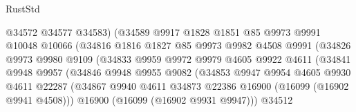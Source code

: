\begin{lexlean}{RustStd}
\begin{coremodule}
                                  @34572
                                  @34577
                                  @34583)
                                (@34589
                                  @9917
                                  @1828
                                  @1851
                                  @85
                                  @9973
                                  @9991
                                  @10048
                                  @10066
                                  (@34816
                                    @1816
                                    @1827
                                    @85
                                    @9973
                                    @9982
                                    @4508
                                    @9991
                                    (@34826
                                      @9973
                                      @9980
                                      @9109
                                      (@34833
                                        @9959
                                        @9972
                                        @9979
                                        @4605
                                        @9922
                                        @4611
                                        (@34841
                                          @9948
                                          @9957
                                          (@34846
                                            @9948
                                            @9955
                                            @9082
                                            (@34853
                                              @9947
                                              @9954
                                              @4605
                                              @9930
                                              @4611
                                              @22287
                                              (@34867
                                                @9940
                                                @4611
                                                @34873
                                                @22386
                                                @16900
                                                (@16099 (@16902 @9941 @4508)))
                                              @16900
                                              (@16099 (@16902 @9931 @9947)))
                                            @34512

\end{coremodule}
\end{lexlean}
